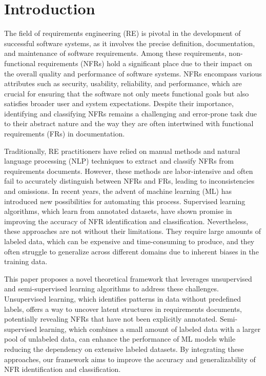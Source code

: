 \documentclass[sigconf,natbib=false]{acmart}
\begin{document}

\maketitle

\section{Introduction}

The field of requirements engineering (RE) is pivotal in the development of successful software systems, as it involves the precise definition, documentation, and maintenance of software requirements. Among these requirements, non-functional requirements (NFRs) hold a significant place due to their impact on the overall quality and performance of software systems. NFRs encompass various attributes such as security, usability, reliability, and performance, which are crucial for ensuring that the software not only meets functional goals but also satisfies broader user and system expectations. Despite their importance, identifying and classifying NFRs remains a challenging and error-prone task due to their abstract nature and the way they are often intertwined with functional requirements (FRs) in documentation.

Traditionally, RE practitioners have relied on manual methods and natural language processing (NLP) techniques to extract and classify NFRs from requirements documents. However, these methods are labor-intensive and often fail to accurately distinguish between NFRs and FRs, leading to inconsistencies and omissions. In recent years, the advent of machine learning (ML) has introduced new possibilities for automating this process. Supervised learning algorithms, which learn from annotated datasets, have shown promise in improving the accuracy of NFR identification and classification. Nevertheless, these approaches are not without their limitations. They require large amounts of labeled data, which can be expensive and time-consuming to produce, and they often struggle to generalize across different domains due to inherent biases in the training data.

This paper proposes a novel theoretical framework that leverages unsupervised and semi-supervised learning algorithms to address these challenges. Unsupervised learning, which identifies patterns in data without predefined labels, offers a way to uncover latent structures in requirements documents, potentially revealing NFRs that have not been explicitly annotated. Semi-supervised learning, which combines a small amount of labeled data with a larger pool of unlabeled data, can enhance the performance of ML models while reducing the dependency on extensive labeled datasets. By integrating these approaches, our framework aims to improve the accuracy and generalizability of NFR identification and classification.
\end{document}
